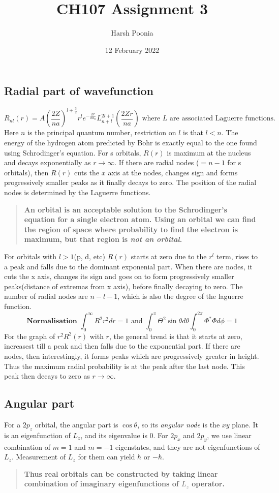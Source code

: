 \documentclass[11pt]{article}
\title{CH107 Assignment 3}
\author{Harsh Poonia}
\date{12 February 2022}
\begin{document}
\maketitle
\subsection*{Radial part of wavefunction}
\[R_{nl}(r) = A \left( \frac{2Z}{na} \right)^{l+\frac{3}{2}} r^l e^{-\frac{Zr}{na_0}} L_{n+l}^{2l+1} \left(\frac{2Zr}{na}\right) \textrm{ where } L \textrm{ are associated Laguerre functions.} \]
Here $n$ is the principal quantum number, restriction on $l$ is that $l<n$. The energy of the hydrogen atom predicted by Bohr is exactly equal to the one found using Schrodinger's equation. For s orbitals, $R(r)$ is maximum at the nucleus and decays exponentially as $r \rightarrow \infty$. If there are radial nodes ($=n-1$ for s orbitals), then $R(r)$ cuts the $x$ axis at the nodes, changes sign and forms progressively smaller peaks as it finally decays to zero.  The position of the radial nodes is determined by the Laguerre functions. 
\begin{quote}
    \textbf{An orbital is an acceptable solution to the Schrodinger's equation for a single electron atom. Using an orbital we can find the region of space where probability to find the electron is maximum, but that region is \emph{not an orbital}.}
\end{quote}
For orbitals with $l>1$(p, d, etc) $R(r)$ starts at zero due to the $r^l$ term, rises to a peak and falls due to the dominant exponenial part. When there are nodes, it cuts the x axis, changes its sign and goes on to form progressively smaller peaks(distance of extremas from x axis), before finally decaying to zero. The number of radial nodes are $n-l-1$, which is also the degree of the laguerre function. \[\textbf{Normalisation } \int_0^{\infty} R^2 r^2 dr =1 \textrm{ and }  \int_0^{\pi} \Theta^2 \sin \theta d \theta \int_0^{2\pi} \Phi^* \Phi d\phi = 1   \]
For the graph of $r^2R^2(r)$ with $r$, the general trend is that it starts at zero, increasest till a peak and then falls due to the exponential part. If there are nodes, then interestingly, it forms peaks which are progressively greater in height. Thus the maximum radial probability is at the peak after the last node. This peak then decays to zero as $r \rightarrow \infty$. 
\subsection*{Angular part}
For a $2p_z$ orbital, the angular part is $\cos \theta$, so its \emph{angular node} is the $xy$ plane. It is an eigenfunction of $L_z$, and its eigenvalue is $0$. For $2p_x$ and $2p_y$, we use linear combination of $m=1$ and $m=-1$ eigenstates, and they are not eigenfunctions of $L_z$. Measurement of $L_z$ for them can yield $\hbar $ or $-\hbar$. 
\begin{quote}
    \textbf{Thus real orbitals can be constructed by taking linear combination of imaginary eigenfunctions of $L_z$ operator. }
\end{quote}
\end{document}
